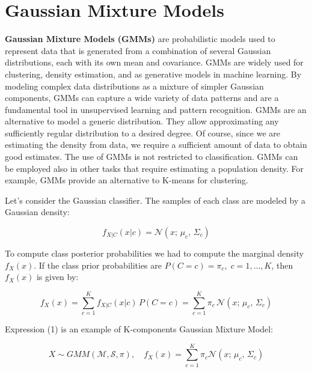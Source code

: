 \setlength{\parindent}{0pt}
\setlength{\parskip}{0.7em}


\section*{Gaussian Mixture Models}

\textbf{Gaussian Mixture Models (GMMs)} are probabilistic models used to represent data that is generated from a combination of several Gaussian distributions, each with its own mean and covariance. GMMs are widely used for clustering, density estimation, and as generative models in machine learning. By modeling complex data distributions as a mixture of simpler Gaussian components, GMMs can capture a wide variety of data patterns and are a fundamental tool in unsupervised learning and pattern recognition. GMMs are an alternative to model a generic distribution. They allow approximating any sufficiently regular distribution to a desired degree. Of course, since we are estimating the density from data, we require a sufficient amount of data to obtain good estimates. The use of GMMs is not restricted to classification. GMMs can be employed also in other tasks that require estimating a population density. For example, GMMs provide an alternative to K-means for clustering.

Let's consider the Gaussian classifier. The samples of each class are modeled by a Gaussian density:

\begin{equation*}
f_{X|C}(x|c) = \mathcal{N}(x;\, \mu_c,\, \Sigma_c)
\end{equation*}

To compute class posterior probabilities we had to compute the marginal density $f_X(x)$. If the class prior probabilities are $P(C = c) = \pi_c,\; c = 1, \ldots, K$, then $f_X(x)$ is given by:


\begin{equation*}
f_X(x) = \sum_{c=1}^{K} f_{X|C}(x|c)\, P(C=c) = \sum_{c=1}^{K} \pi_c\, \mathcal{N}(x;\, \mu_c,\, \Sigma_c) \tag{1}
\end{equation*}

Expression (1) is an example of K-components Gaussian Mixture Model:


\begin{equation*}
X \sim GMM(\mathcal{M}, \mathcal{S}, \pi),\quad f_X(x) = \sum_{c=1}^K \pi_c \mathcal{N}(x;\, \mu_c,\, \Sigma_c)
\end{equation*}

